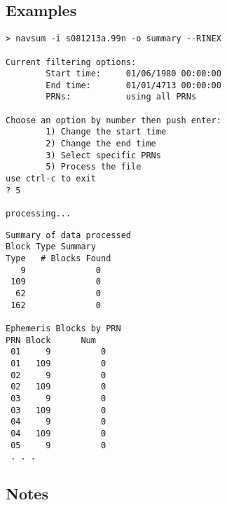 \subsection{Examples}
\begin{\outputsize}
\begin{lstlisting}
> navsum -i s081213a.99n -o summary --RINEX

Current filtering options:
        Start time:     01/06/1980 00:00:00
        End time:       01/01/4713 00:00:00
        PRNs:           using all PRNs

Choose an option by number then push enter:
        1) Change the start time
        2) Change the end time
        3) Select specific PRNs
        5) Process the file
use ctrl-c to exit
? 5

processing...
\end{lstlisting}
\begin{verbatim}
Summary of data processed
Block Type Summary
Type   # Blocks Found
   9              0
 109              0
  62              0
 162              0

Ephemeris Blocks by PRN
PRN Block      Num
 01     9          0
 01   109          0
 02     9          0
 02   109          0
 03     9          0
 03   109          0
 04     9          0
 04   109          0
 05     9          0
 . . .
\end{verbatim}

\end{\outputsize}

\subsection{Notes}

%
